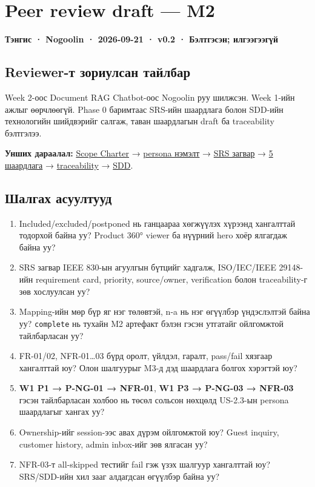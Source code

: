 \section{Peer review draft --- M2}\label{doc7-peer-review-draft-m2}

\textbf{Тэнгис · Nogoolin · 2026-09-21 · v0.2 · Бэлтгэсэн; илгээгээгүй}

\subsection{Reviewer-т зориулсан
тайлбар}\label{doc7-reviewer-ux442-ux437ux43eux440ux438ux443ux43bux441ux430ux43d-ux442ux430ux439ux43bux431ux430ux440}

Week 2-оос Document RAG Chatbot-оос Nogoolin руу шилжсэн. Week 1-ийн
ажлыг өөрчлөөгүй. Phase 0 баримтаас SRS-ийн шаардлага болон SDD-ийн
технологийн шийдвэрийг салгаж, таван шаардлагын draft ба traceability
бэлтгэлээ.

\textbf{Унших дараалал:}
\href{../../requirements/scope-charter.md}{Scope Charter} →
\href{wiki/persona-and-pivot.md}{persona нэмэлт} →
\href{../../requirements/srs-template.md}{SRS загвар} →
\href{../../requirements/requirements.md}{5 шаардлага} →
\href{../../requirements/traceability-matrix.md}{traceability} →
\href{../../architecture/sdd-template.md}{SDD}.

\subsection{Шалгах
асуултууд}\label{doc7-ux448ux430ux43bux433ux430ux445-ux430ux441ux443ux443ux43bux442ux443ux443ux434}

\begin{enumerate}
\def\labelenumi{\arabic{enumi}.}
\tightlist
\item
  Included/excluded/postponed нь ганцаараа хөгжүүлэх хүрээнд хангалттай
  тодорхой байна уу? Product 360° viewer ба нүүрний hero хоёр ялгагдаж
  байна уу?
\item
  SRS загвар IEEE 830-ын агуулгын бүтцийг хадгалж, ISO/IEC/IEEE
  29148-ийн requirement card, priority, source/owner, verification болон
  traceability-г зөв хослуулсан уу?
\item
  Mapping-ийн мөр бүр яг нэг төлөвтэй, n-a нь нэг өгүүлбэр үндэслэлтэй
  байна уу? \nolinkurl{complete} нь тухайн M2 артефакт бэлэн гэсэн
  утгатайг ойлгомжтой тайлбарласан уу?
\item
  FR-01/02, NFR-01\ldots03 бүрд оролт, үйлдэл, гаралт, pass/fail хязгаар
  хангалттай юу? Олон шалгуурыг M3-д дэд шаардлага болгох хэрэгтэй юу?
\item
  \textbf{W1 P1 → P-NG-01 → NFR-01}, \textbf{W1 P3 → P-NG-03 → NFR-03}
  гэсэн тайлбарласан холбоо нь төсөл сольсон нөхцөлд US-2.3-ын persona
  шаардлагыг хангах уу?
\item
  Ownership-ийг session-ээс авах дүрэм ойлгомжтой юу? Guest inquiry,
  customer history, admin inbox-ийг зөв ялгасан уу?
\item
  NFR-03-т all-skipped тестийг fail гэж үзэх шалгуур хангалттай юу?
  SRS/SDD-ийн хил зааг алдагдсан өгүүлбэр байна уу?
\end{enumerate}

